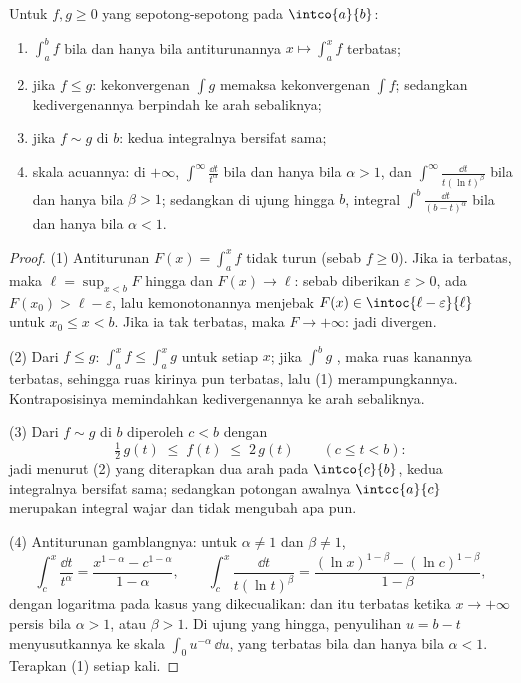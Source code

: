 \begin{theorem}\label{thm:b2:integration:comparison}
Untuk $f, g \geq 0$ yang  sepotong-sepotong pada $\intco{a}{b}$:
\begin{enumerate}
  \item $\int_a^b f$  bila dan hanya bila antiturunannya $x
        \mapsto \int_a^x f$ terbatas;
  \item jika $f \leq g$: kekonvergenan $\int g$ memaksa kekonvergenan
        $\int f$; sedangkan kedivergenannya berpindah ke arah sebaliknya;
  \item jika $f \sim g$ di $b$: kedua integralnya bersifat sama;
  \item skala acuannya: di $+\infty$, $\int^{\infty}
        \frac{\dd t}{t^\alpha}$  bila dan hanya bila $\alpha >
        1$, dan $\int^\infty \frac{\dd t}{t(\ln t)^\beta}$ bila dan
        hanya bila $\beta > 1$; sedangkan di ujung hingga $b$, integral
        $\int^b \frac{\dd t}{(b - t)^\alpha}$  bila dan hanya
        bila $\alpha < 1$.
\end{enumerate}
\end{theorem}

\begin{proof}
(1) Antiturunan $F(x) = \int_a^x f$ tidak turun (sebab $f \geq
0$). Jika ia terbatas, maka $\ell = \sup_{x < b}F$ hingga dan
$F(x) \to \ell$: sebab diberikan $\varepsilon > 0$, ada $F(x_0) > \ell -
\varepsilon$, lalu kemonotonannya menjebak $F(x) \in
\intoc{\ell - \varepsilon}{\ell}$ untuk $x_0 \leq x < b$. Jika ia tak
terbatas, maka $F \to +\infty$: jadi divergen.

(2) Dari $f \leq g$: $\int_a^x f \leq \int_a^x g$ untuk setiap $x$;
jika $\int^b g$ , maka ruas kanannya terbatas, sehingga ruas
kirinya pun terbatas, lalu (1) merampungkannya. Kontraposisinya
memindahkan kedivergenannya ke arah sebaliknya.

(3) Dari $f \sim g$ di $b$ diperoleh $c < b$ dengan
\[
\tfrac12\,g(t) \;\leq\; f(t) \;\leq\; 2\,g(t)
\qquad (c \leq t < b) :
\]
jadi menurut (2) yang diterapkan dua arah pada $\intco{c}{b}$, kedua
integralnya bersifat sama; sedangkan potongan awalnya $\intcc{a}{c}$
merupakan integral wajar dan tidak mengubah apa pun.

(4) Antiturunan gamblangnya: untuk $\alpha \neq 1$ dan $\beta \neq 1$,
\[
\int_c^x \frac{\dd t}{t^\alpha}
= \frac{x^{1-\alpha} - c^{1-\alpha}}{1 - \alpha},
\qquad
\int_c^x \frac{\dd t}{t(\ln t)^\beta}
= \frac{(\ln x)^{1-\beta} - (\ln c)^{1-\beta}}{1 - \beta},
\]
dengan logaritma pada kasus yang dikecualikan: dan itu terbatas ketika
$x \to +\infty$ persis bila $\alpha > 1$, atau $\beta > 1$. Di ujung
yang hingga, penyulihan $u = b - t$ menyusutkannya ke
skala $\int_0 u^{-\alpha}\,\dd u$, yang terbatas bila dan hanya bila
$\alpha < 1$. Terapkan (1) setiap kali.
\end{proof}

